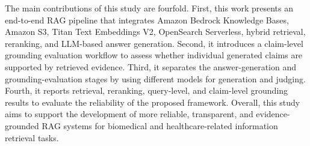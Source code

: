 The main contributions of this study are fourfold. First, this work presents an end-to-end RAG pipeline that integrates Amazon Bedrock Knowledge Bases, Amazon S3, Titan Text Embeddings V2, OpenSearch Serverless, hybrid retrieval, reranking, and LLM-based answer generation. Second, it introduces a claim-level grounding evaluation workflow to assess whether individual generated claims are supported by retrieved evidence. Third, it separates the answer-generation and grounding-evaluation stages by using different models for generation and judging. Fourth, it reports retrieval, reranking, query-level, and claim-level grounding results to evaluate the reliability of the proposed framework. Overall, this study aims to support the development of more reliable, transparent, and evidence-grounded RAG systems for biomedical and healthcare-related information retrieval tasks.
